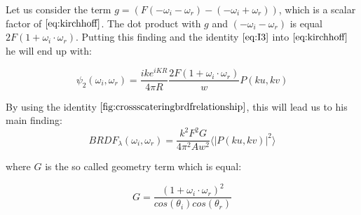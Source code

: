 Let us consider the term $g = (F(-\omega_i - \omega_r)-(-\omega_i + \omega_r))$, which is a scalar factor of $\ref{eq:kirchhoff}$. The dot product with $g$ and $(-\omega_i - \omega_r)$ is equal $2F(1 + \omega_i \cdot \omega_r)$. Putting this finding and the identity $\ref{eq:I3}$ into $\ref{eq:kirchhoff}$ he will end up with:

\begin{equation}
\psi_{2}(\omega_i, \omega_r) = \frac{i k e^{i K R}}{4 \pi R} \frac{2F(1 + \omega_i \cdot \omega_r)}{w} P(ku, kv)
\label{eq:kirchhoffFinding}
\end{equation}

By using the identity $\ref{fig:crossscateringbrdfrelationship}$, this will lead us to his main finding:
\begin{equation} 
  BRDF_{\lambda}(\omega_i, \omega_r) = \frac{k^2 F^2 G}{4\pi^2 A w^2} \langle \left|P(ku, kv)\right|^2\rangle
\label{eq:mainstam}
\end{equation}

where $G$ is the so called geometry term which is equal: 

\begin{equation}
  G =\frac{(1 + \omega_i \cdot \omega_r)^2}{cos(\theta_i)cos(\theta_r)}
\label{eq:geometricterm}
\end{equation}

